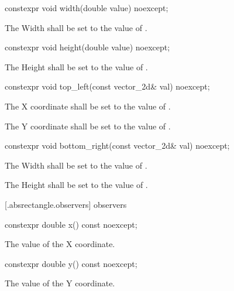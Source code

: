 \begin{itemdecl}
constexpr void width(double value) noexcept;
\end{itemdecl}
\begin{itemdescr}
\pnum
\effects
The Width shall be set to the value of .
\end{itemdescr}

\begin{itemdecl}
constexpr void height(double value) noexcept;
\end{itemdecl}
\begin{itemdescr}
\pnum
\effects
The Height shall be set to the value of .
\end{itemdescr}

\begin{itemdecl}
constexpr void top_left(const vector_2d& val) noexcept;
\end{itemdecl}
\begin{itemdescr}
\pnum
\effects
The X coordinate shall be set to the value of .

\effects
The Y coordinate shall be set to the value of .
\end{itemdescr}

\begin{itemdecl}
constexpr void bottom_right(const vector_2d& val) noexcept;
\end{itemdecl}
\begin{itemdescr}
\pnum
\effects
The Width shall be set to the value of .

\pnum
The Height shall be set to the value of .
\end{itemdescr}

 [\iotwod.absrectangle.observers]{ observers}

\begin{itemdecl}
constexpr double x() const noexcept;
\end{itemdecl}
\begin{itemdescr}
\pnum
\returns
The value of the X coordinate.
\end{itemdescr}

\begin{itemdecl}
constexpr double y() const noexcept;
\end{itemdecl}
\begin{itemdescr}
\pnum
\returns
The value of the Y coordinate.
\end{itemdescr}

